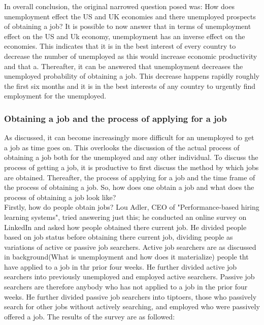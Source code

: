 In overall conclusion, the original narrowed question posed was:
How does unemployment effect the US and UK economies and there unemployed prospects of obtaining a job?
It is possible to now answer that in terms of unemployment effect on the US and Uk economy, unemployment has an inverse effect on the economies.
This indicates that it is in the best interest of every country to decrease the number of unemployed as this would increase economic productivity and that a.
Thereafter, it can be answered that unemployment decreases the unemployed probability of obtaining a job.
This decrease happens rapidly roughly the first six months and it is in the best interests of any country to urgently find employment for the unemployed. \\

\subsubsection{Obtaining a job and the process of applying for a job}
As discussed, it can become increasingly more difficult for an unemployed to get a job as time goes on.
This overlooks the discussion of the actual process of obtaining a job both for the unemployed and any other individual.
To discuss the process of getting a job, it is productive to first discuss the method by which jobs are obtained.
Thereafter, the process of applying for a job and the time frame of the process of obtaining a job.
So, how does one obtain a job and what does the process of obtaining a job look like? \\

Firstly, how do people obtain jobs?
Lou Adler, CEO of "Performance-based hiring learning systems", tried answering just this; he conducted an online survey on LinkedIn and asked how people obtained there current job.
He divided people based on job status before obtaining there current job, dividing people as variations of active or passive job searchers.
Active job searchers are as discussed in background(What is unemployment and how does it materialize) people tht have applied to a job in thr prior four weeks.
He further divided active job searchers into previously unemployed and employed active searchers.
Passive job searchers are therefore anybody who has not applied to a job in the prior four weeks.
He further divided passive job searchers into tiptoers, those who passively search for other jobs without actively searching, and employed who were passively offered a job.
The results of the survey are as followed: \\

